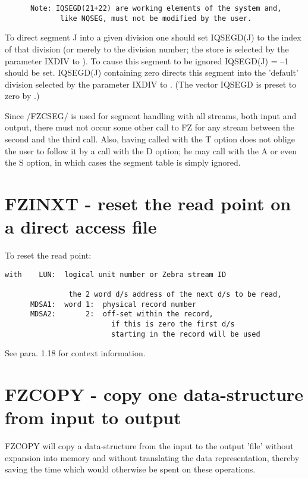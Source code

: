 {\begin{verbatim}
      Note: IQSEGD(21+22) are working elements of the system and,
             like NQSEG, must not be modified by the user.
\end{verbatim}
To direct segment J into a given division one should set
IQSEGD(J) to the index of that division
(or merely to the division number;
the store is selected by the parameter IXDIV to ).
To cause this segment to be ignored IQSEGD(J) = --1 should be set.
IQSEGD(J) containing zero directs this segment into the
'default' division selected by the parameter IXDIV to .
(The vector IQSEGD is preset to zero by .)

Since /FZCSEG/ is used for segment handling with all streams,
both input and output, there must not occur some other call
to FZ for any stream between the second and the third call.
Also, having called with the T option does not oblige the user
to follow it by a call with the D option;
he may call with the A or even the S option,
in which cases the segment table is simply ignored.

\section{FZINXT - reset the read point on a direct access file}

To reset the read point:

\begin{verbatim}
with    LUN:  logical unit number or Zebra stream ID

               the 2 word d/s address of the next d/s to be read,
      MDSA1:  word 1:  physical record number
      MDSA2:       2:  off-set within the record,
                         if this is zero the first d/s
                         starting in the record will be used
\end{verbatim}
See para. 1.18 for context information.

\section{FZCOPY - copy one data-structure from input to output}

FZCOPY will copy a data-structure from the input to the output 'file'
without expansion into memory and without translating the data
representation, thereby saving the time which would otherwise
be spent on these operations.

}
